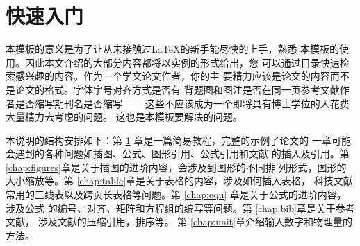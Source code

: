 \chapter{快速入门}\label{chap:introduction}


本模板的意义是为了让从未接触过\LaTeX 的新手能尽快的上手，熟悉
本模板的使用。因此本文介绍的大部分内容都将以实例的形式给出，您
可以通过目录快速检索感兴趣的内容。作为一个学文论文作者，你的主
要精力应该是论文的内容而不是论文的格式。字体字号对齐方式是否有
背题图和图注是否在同一页参考文献作者是否缩写期刊名是否缩写——
这些不应该成为一个即将具有博士学位的人花费大量精力去考虑的问题。
这也是本模板要解决的问题。

本说明的结构安排如下：第 \ref{chap:introduction} 章是一篇简易教程，完整的示例了论文的
一章可能会遇到的各种问题如插图、公式、图形引用、公式引用和文献
的插入及引用。第 \ref{chap:figures}章是关于插图的进阶内容，会涉及到图形的不同排
列形式，图形的大小缩放等。第 \ref{chap:table}章是关于表格的内容，涉及如何插入表格，
科技文献常用的三线表以及跨页长表格等问题。第 \ref{chap:equ} 章是关于公式的进阶内容，涉及公式
的编号、对齐、矩阵和方程组的编写等问题。第 \ref{chap:bib}章是关于参考文献，
涉及文献的压缩引用，排序等。%
第 \ref{chap:unit}章介绍输入数字和物理量的方法。

